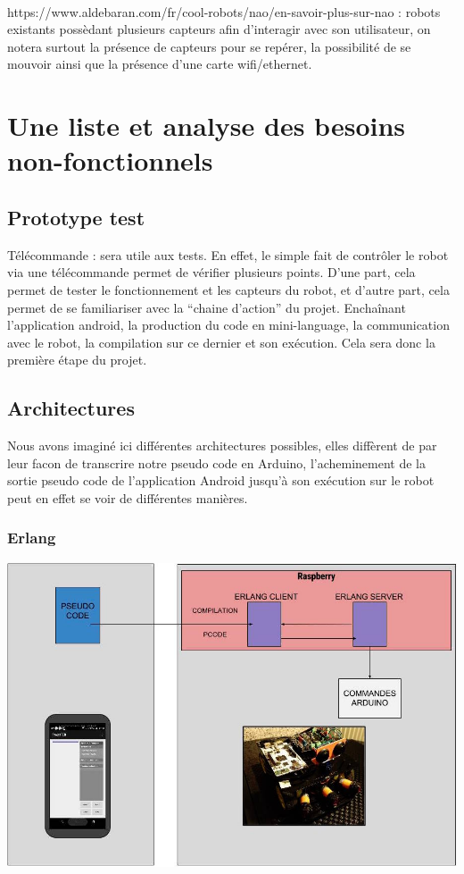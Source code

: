 \documentclass[a4paper]{article}
\begin{document}
\paragraph{}
https://www.aldebaran.com/fr/cool-robots/nao/en-savoir-plus-sur-nao : robots existants possèdant plusieurs capteurs afin d’interagir avec son utilisateur, on notera surtout la présence de capteurs pour se repérer, la possibilité de se mouvoir ainsi que la présence d’une carte wifi/ethernet.

\section{Une liste et analyse des besoins non-fonctionnels}
\subsection{Prototype test}
Télécommande : sera utile aux tests. En effet, le simple fait de contrôler le robot via une télécommande permet de vérifier plusieurs points. D’une part, cela permet de tester le fonctionnement et les capteurs du robot, et d’autre part, cela permet de se familiariser avec la “chaine d’action” du projet. Enchaînant l’application android, la production du code en mini-language, la communication avec le robot, la compilation sur ce dernier et son exécution. Cela sera donc la première étape du projet.

\subsection{Architectures}
Nous avons imaginé ici différentes architectures possibles, elles diffèrent de par leur facon de transcrire notre pseudo code en Arduino, l’acheminement de la sortie pseudo code de l’application Android jusqu'à son exécution sur le robot peut en effet se voir de différentes manières.
\subsubsection{Erlang}

\begin{center}
\includegraphics[scale=0.5]{img/archi-erlang.jpg}
\end{center}
\end{document}
